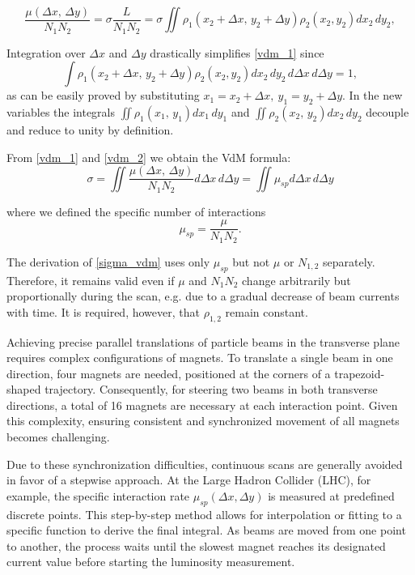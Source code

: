 \begin{equation}
\frac{\mu (\Delta x,\, \Delta y)}{N_1N_2} = \sigma \frac{L}{N_1N_2} = \sigma \iint \rho _1(x_2 + \Delta x,\, y_2 + \Delta y) \rho _2(x_2,y_2) dx_2\, dy_2, \label{vdm_1}
\end{equation}

Integration over $\Delta x$ and $\Delta y$ drastically simplifies \eqref{vdm_1} since
\begin{equation} \int \rho _1(x_2 {+} \Delta x,\, y_2 {+} \Delta y) \rho _2(x_2,y_2) dx_2\, dy_2\, d\Delta x\, d\Delta y {=} 1, \label{vdm_2} \end{equation}
as can be easily proved by substituting $x_1=x_2+\Delta x,\ y_1=y_2+\Delta y$. In the new variables the integrals $\iint \rho _1(x_1,\, y_1)dx_1\,dy_1$ and $\iint \rho _2(x_2,\, y_2)dx_2\,dy_2$ decouple and reduce to unity by definition.

From \eqref{vdm_1} and \eqref{vdm_2} we obtain the VdM formula:
\begin{equation}
     \sigma = \iint \frac{\mu (\Delta x,\, \Delta y)}{N_1N_2} d\Delta x\, d\Delta y=\iint \mu_{sp}d\Delta x\, d \Delta y \label{sigma_vdm}
    \end{equation}

where we defined the specific number of interactions
\begin{equation}
\mu_{sp}=\frac{\mu}{N_1 N_2}.
\end{equation}

The derivation of \eqref{sigma_vdm} uses only $\mu _{sp}$ but not $\mu$ or $N_{1,2}$ separately. Therefore, it remains valid even if $\mu$ and $N_1N_2$ change arbitrarily but proportionally during the scan, e.g. due to a gradual decrease of beam currents with time. It is required, however, that $\rho_{1,2}$ remain constant.

Achieving precise parallel translations of particle beams in the transverse plane requires complex configurations of magnets. To translate a single beam in one direction, four magnets are needed, positioned at the corners of a trapezoid-shaped trajectory. Consequently, for steering two beams in both transverse directions, a total of 16 magnets are necessary at each interaction point. Given this complexity, ensuring consistent and synchronized movement of all magnets becomes challenging.

Due to these synchronization difficulties, continuous scans are generally avoided in favor of a stepwise approach. At the Large Hadron Collider (LHC), for example, the specific interaction rate $\mu_{sp}(\Delta x,\Delta y)$ is measured at predefined discrete points. This step-by-step method allows for interpolation or fitting to a specific function to derive the final integral. As beams are moved from one point to another, the process waits until the slowest magnet reaches its designated current value before starting the luminosity measurement.

